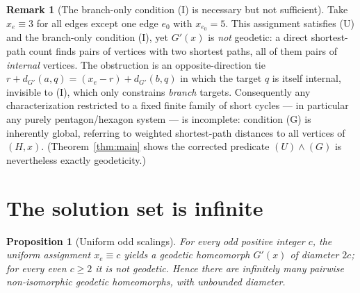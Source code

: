 \documentclass{amsart}
\newtheorem{proposition}{Proposition}
\theoremstyle{definition}
\newtheorem{remark}{Remark}
\begin{document}
\begin{remark}[The branch-only condition (I) is necessary but not
sufficient]\label{rem:counterex}
Take $x_e\equiv3$ for all edges except one edge $e_0$ with $x_{e_0}=5$. This
assignment satisfies (U) and the branch-only condition (I), yet $G'(x)$ is
\emph{not} geodetic: a direct shortest-path count finds pairs of vertices with
two shortest paths, all of them pairs of \emph{internal} vertices. The
obstruction is an opposite-direction tie
$r+d_{G'}(a,q)=(x_e-r)+d_{G'}(b,q)$ in which the target $q$ is itself internal,
invisible to (I), which only constrains \emph{branch} targets. Consequently any
characterization restricted to a fixed finite family of short cycles --- in
particular any purely pentagon/hexagon system --- is incomplete: condition (G) is
inherently global, referring to weighted shortest-path distances to all vertices
of $(H,x)$. (Theorem~\ref{thm:main} shows the corrected predicate
$(U)\wedge(G)$ is nevertheless exactly geodeticity.)
\end{remark}

\section{The solution set is infinite}

\begin{proposition}[Uniform odd scalings]\label{prop:infinite}
For every odd positive integer $c$, the uniform assignment $x_e\equiv c$ yields a
geodetic homeomorph $G'(x)$ of diameter $2c$; for every even $c\ge2$ it is not
geodetic. Hence there are infinitely many pairwise non-isomorphic geodetic
homeomorphs, with unbounded diameter.
\end{proposition}
\end{document}
